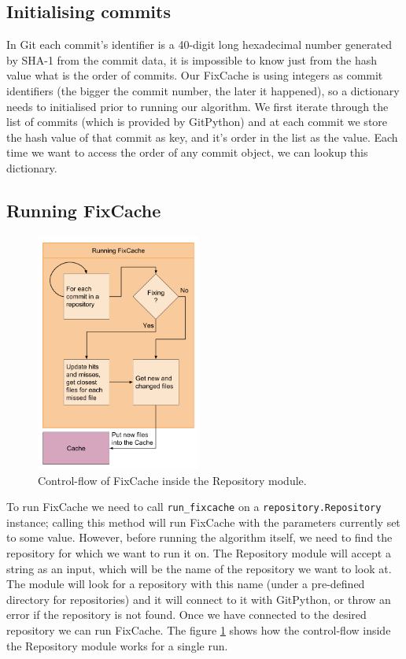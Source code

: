 \documentclass[12pt,twoside,notitlepage]{report}
\newcommand{\fxch}{FixCache}
\begin{document}
\subsection{Initialising commits} In Git each commit's identifier is a 40-digit long hexadecimal number generated by SHA-1 from the commit data, it is impossible to know just from the hash value what is the order of commits. Our \fxch{} is using integers as commit identifiers (the bigger the commit number, the later it happened), so a dictionary needs to initialised prior to running our algorithm. We first iterate through the list of commits (which is provided by GitPython) and at each commit we store the hash value of that commit as key, and it's order in the list as the value. Each time we want to access the order of any commit object, we can lookup this dictionary.
\clearpage
\subsection{Running \fxch{}}
\begin{figure}
\begin{center}
\vspace*{-0.5in}
\includegraphics[width=0.48\textwidth]{repository_module.png}
\end{center}
\caption{Control-flow of \fxch{} inside the Repository module.}
\label{run_fxch}
\end{figure}
To run \fxch{} we need to call \texttt{run\_fixcache} on a \texttt{repository.Repository} instance; calling this method will run \fxch{} with the parameters currently set to some value. However, before running the algorithm itself, we need to find the repository for which we want to run it on. The Repository module will accept a string as an input, which will be the name of the repository we want to look at. The module will look for a repository with this name (under a pre-defined directory for repositories) and it will connect to it with GitPython, or throw an error if the repository is not found. Once we have connected to the desired repository we can run \fxch{}. The figure \ref{run_fxch} shows how the control-flow inside the Repository module works for a single run.
\end{document}
